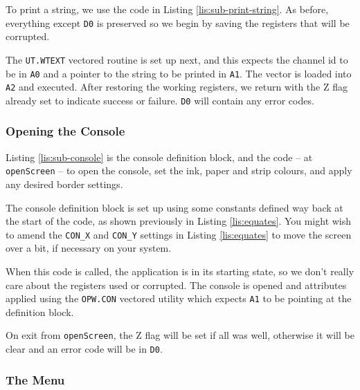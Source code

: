 To print a string, we use the code in Listing \ref{lis:sub-print-string}.
As before, everything except \texttt{D0} is preserved so we begin
by saving the registers that will be corrupted.



The \texttt{UT.WTEXT} vectored routine is set up next, and this expects
the channel id to be in \texttt{A0} and a pointer to the string to
be printed in \texttt{A1}. The vector is loaded into \texttt{A2} and
executed. After restoring the working registers, we return with the
Z flag already set to indicate success or failure. \texttt{D0} will
contain any error codes.

\subsubsection{Opening the Console}

Listing \ref{lis:sub-console} is the console definition block, and
the code -- at \texttt{openScreen} -- to open the console, set the
ink, paper and strip colours, and apply any desired border settings.



The console definition block is set up using some constants defined
way back at the start of the code, as shown previously in Listing
\ref{lis:equates}. You might wish to amend the \texttt{CON\_X} and
\texttt{CON\_Y} settings in Listing \ref{lis:equates} to move the
screen over a bit, if necessary on your system.

When this code is called, the application is in its starting state,
so we don't really care about the registers used or corrupted. The
console is opened and attributes applied using the \texttt{OPW.CON}
vectored utility which expects \texttt{A1} to be pointing at the definition
block.

On exit from \texttt{openScreen}, the Z flag will be set if all was
well, otherwise it will be clear and an error code will be in \texttt{D0}.

\subsubsection{The Menu}

